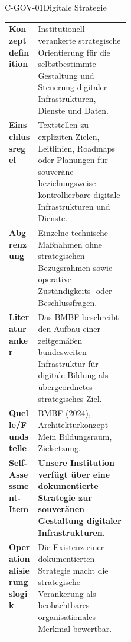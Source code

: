 \documentclass[10pt,a4paper]{article}
\begin{document}
\begin{codecard}{C-GOV-01}{Digitale Strategie}
\begin{tabularx}{\linewidth}{@{}>{\RaggedRight\arraybackslash\bfseries\color{DeepNavy}}p{0.245\linewidth}>{\RaggedRight\arraybackslash}X@{}}
Konzeptdefinition & Institutionell verankerte strategische Orientierung für die selbstbestimmte Gestaltung und Steuerung digitaler Infrastrukturen, Dienste und Daten. \\
\arrayrulecolor{SoftRule}\hline
Einschlussregel & Textstellen zu expliziten Zielen, Leitlinien, Roadmaps oder Planungen für souveräne beziehungsweise kontrollierbare digitale Infrastrukturen und Dienste. \\
\arrayrulecolor{SoftRule}\hline
Abgrenzung & Einzelne technische Maßnahmen ohne strategischen Bezugsrahmen sowie operative Zuständigkeits- oder Beschlussfragen. \\
\arrayrulecolor{SoftRule}\hline
Literaturanker & Das BMBF beschreibt den Aufbau einer zeitgemäßen bundesweiten Infrastruktur für digitale Bildung als übergeordnetes strategisches Ziel. \\
\arrayrulecolor{SoftRule}\hline
Quelle/Fundstelle & BMBF (2024), Architekturkonzept Mein Bildungsraum, Zielsetzung. \\
\arrayrulecolor{SoftRule}\hline
Self-Assessment-Item & \textbf{Unsere Institution verfügt über eine dokumentierte Strategie zur souveränen Gestaltung digitaler Infrastrukturen.} \\
\arrayrulecolor{SoftRule}\hline
Operationalisierungslogik & Die Existenz einer dokumentierten Strategie macht die strategische Verankerung als beobachtbares organisationales Merkmal bewertbar. \\
\end{tabularx}
\end{codecard}
\end{document}
